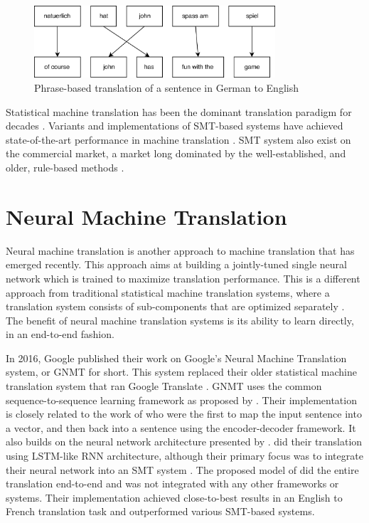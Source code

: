 \label{sec:statistical_machine_translation}
\begin{figure}[ht]
    \centering
    \includegraphics[width=0.8\textwidth]{fig/related_work/translation.png}
    \caption{Phrase-based translation of a sentence in German to English}
    \label{fig:translation-phrase-based}
\end{figure}

Statistical machine translation has been the dominant translation paradigm for decades \citep{wu2016google}. Variants and implementations of SMT-based systems have achieved state-of-the-art performance in machine translation \citep{watanabe07onlinelargemargin}. SMT system also exist on the commercial market, a market long dominated by the well-established, and older, rule-based methods \citep{hutchins2007machine}.


\section{Neural Machine Translation}
\label{sec:neural_machine_translation}
Neural machine translation is another approach to machine translation that has emerged recently. This approach aims at building a jointly-tuned single neural network which is trained to maximize translation performance. This is a different approach from traditional statistical machine translation systems, where a translation system consists of sub-components that are optimized separately \citep{wolk2015neural}. The benefit of neural machine translation systems is its ability to learn directly, in an end-to-end fashion. 

In 2016, Google published their work on Google's Neural Machine Translation system, or GNMT for short. This system replaced their older statistical machine translation system that ran Google Translate \citep{turovsky2016googletranslatenmt}. GNMT uses the common sequence-to-sequence learning framework as proposed by \cite{sutskever2014sequence, wu2016google}. Their implementation is closely related to the work of \cite{kalchbrenner2013recurrent} who were the first to map the input sentence into a vector, and then back into a sentence using the encoder-decoder framework. It also builds on the neural network architecture presented by \cite{cho2014learning}. \cite{cho2014learning} did their translation using LSTM-like RNN architecture, although their primary focus was to integrate their neural network into an SMT system \citep{cho2014learning, sutskever2014sequence}. The proposed model of \cite{sutskever2014sequence} did the entire translation end-to-end and was not integrated with any other frameworks or systems. Their implementation achieved close-to-best results in an English to French translation task and outperformed various SMT-based systems.

